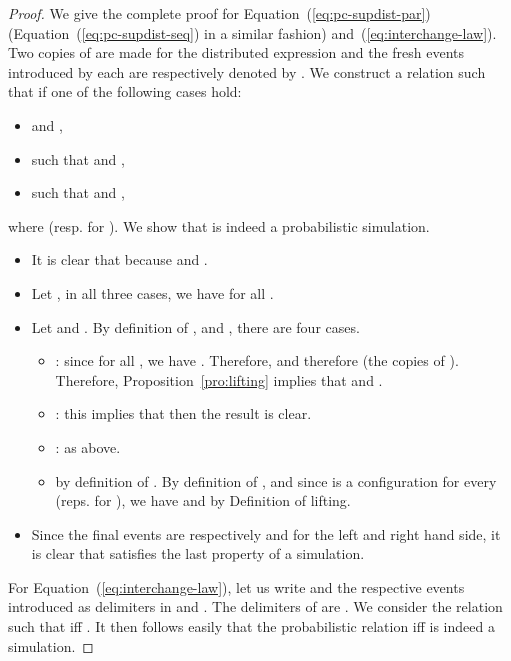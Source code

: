 \documentclass{llncs}
\newcommand{\<}{\langle}
\renewcommand{\>}{\rangle}
\begin{document}
\begin{proof}
We give the complete proof for Equation~(\ref{eq:pc-supdist-par}) (Equation~(\ref{eq:pc-supdist-seq}) in a similar fashion) and~(\ref{eq:interchange-law}). Two copies of  are made for the distributed expression and the fresh events introduced by each  are respectively denoted by . We construct a relation 
 such that  if one of the following cases hold:
\begin{itemize}
\item  and ,
\item  such that  and ,
\item  such that  and ,
\end{itemize}
where  (resp. for ). We show that  is indeed a probabilistic simulation.
\begin{itemize}
\item It is clear that  because  and .
\item Let , in all three cases, we have  for all .
\item Let  and . By definition of ,  and , there are four cases.
\begin{itemize}
\item : since  for all , we have . Therefore,  and therefore   (the copies of ). Therefore, Proposition~\ref{pro:lifting} implies that  and .
\item : this implies that  then the result is clear. 
\item : as above.
\item  by definition of . By definition of ,  and since  is a configuration for every  (reps. for ), we have  and  by Definition of lifting.
\end{itemize}
\item Since the final events are respectively  and  for the left and right hand side, it is clear that  satisfies the last property of a simulation.
\end{itemize}
For Equation~(\ref{eq:interchange-law}), let us write  and  the respective events introduced as delimiters in  and . The delimiters of  are . We consider the relation  such that  iff . It then follows easily that the probabilistic relation  iff  is indeed a simulation.
\end{proof}
\end{document}

